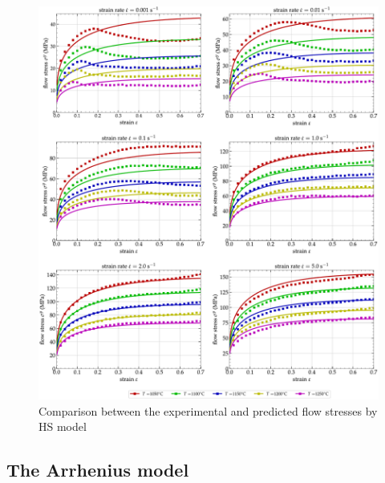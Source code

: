 \documentclass[twoside,english,1p,final,sort&compress]{elsarticle}
\theoremstyle{plain}
\begin{document}
\begin{figure}[!ht]
\centering
\includegraphics[width=\columnwidth]
{Figures/CompExp-HS-6}
\caption{Comparison between the experimental and predicted flow stresses by HS model}
\label{fig:CompExp-HS-6}
\end{figure}

\subsection{The Arrhenius model\label{sec:ARmodel}}
\end{document}
